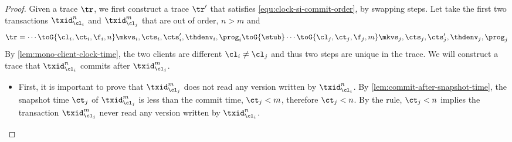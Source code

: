 \begin{proof}
    Given a trace \( \tr \), we first construct a trace \( \tr' \)  that satisfies \cref{equ:clock-si-commit-order}, by swapping steps.
    Let take the first two transactions \( \txid_{\cl_i}^n \) and \( \txid_{\cl_j}^m \) that are out of order, \ie \( n > m \) and 
    \[
    \begin{array}{@{}l@{}}
        \tr = \cdots \toG{\cl_i,\ct_i,\f_i,n} \mkvs_i, \cts_i, \cts'_i, \thdenv_i, \prog_i \toG{\stub}  \cdots \toG{\cl_j,\ct_j,\f_j,m} \mkvs_j, \cts_j, \cts'_j, \thdenv_j, \prog_j \\
    \end{array}
    \]
    By \cref{lem:mono-client-clock-time}, the two clients are different \( \cl_i \neq \cl_j \) and thus two steps are unique in the trace.
    We will construct a trace that \( \txid_{\cl_i}^n \) commits after \( \txid_{\cl_j}^m  \).
    \begin{itemize}
    \item First, it is important to prove that \( \txid_{\cl_j}^m \) does not read any version written by \( \txid_{\cl_i}^n\).
    By \cref{lem:commit-after-snapshot-time}, the snapshot time \( \ct_j \) of \( \txid_{\cl_j}^m \) is less than the commit time, 
    \ie \( \ct_j < m \), therefore \( \ct_j < n \).                                                                                  
    By the  rule, \( \ct_j < n \) implies the transaction \( \txid_{\cl_j}^m \) never read any version written by \( \txid_{\cl_i}^n \).


\end{itemize}
\end{proof}
